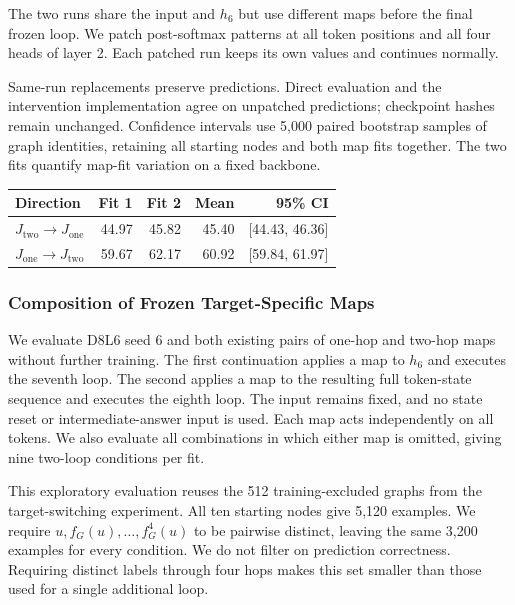\documentclass{article}
\begin{document}
The two runs share the input and $h_6$ but use different maps before the final frozen loop. We patch post-softmax patterns at all token positions and all four heads of layer 2. Each patched run keeps its own values and continues normally.

Same-run replacements preserve predictions. Direct evaluation and the intervention implementation agree on unpatched predictions; checkpoint hashes remain unchanged. Confidence intervals use 5,000 paired bootstrap samples of graph identities, retaining all starting nodes and both map fits together. The two fits quantify map-fit variation on a fixed backbone.

\begin{center}\begin{minipage}{\linewidth}\centering\centering
\captionsetup{hypcap=false}
\begin{tabular}{@{}lrrrr@{}}\toprule
Direction & Fit 1 & Fit 2 & Mean & 95\% CI\\\midrule
$J_{\mathrm{two}}\!\to\!J_{\mathrm{one}}$ & 44.97 & 45.82 & 45.40 & [44.43, 46.36] \\
$J_{\mathrm{one}}\!\to\!J_{\mathrm{two}}$ & 59.67 & 62.17 & 60.92 & [59.84, 61.97] \\
\bottomrule\end{tabular}\end{minipage}\end{center}

\subsubsection{Composition of Frozen Target-Specific Maps}
\label{app:composition}
We evaluate D8L6 seed 6 and both existing pairs of one-hop and two-hop maps without further training. The first continuation applies a map to $h_6$ and executes the seventh loop. The second applies a map to the resulting full token-state sequence and executes the eighth loop. The input remains fixed, and no state reset or intermediate-answer input is used. Each map acts independently on all tokens. We also evaluate all combinations in which either map is omitted, giving nine two-loop conditions per fit.

This exploratory evaluation reuses the 512 training-excluded graphs from the target-switching experiment. All ten starting nodes give 5,120 examples. We require $u,f_G(u),\ldots,f_G^4(u)$ to be pairwise distinct, leaving the same 3,200 examples for every condition. We do not filter on prediction correctness. Requiring distinct labels through four hops makes this set smaller than those used for a single additional loop.
\end{document}
